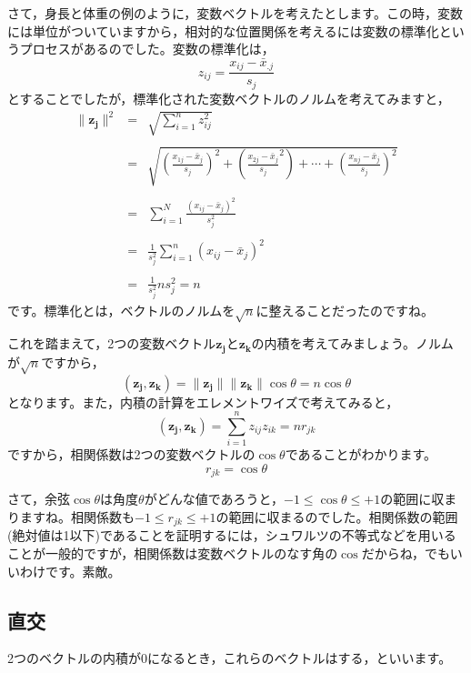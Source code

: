 \documentclass{ltjsbook}
\begin{document}
さて，身長と体重の例のように，変数ベクトルを考えたとします。この時，変数には単位がついていますから，相対的な位置関係を考えるには変数の標準化というプロセスがあるのでした。変数の標準化は，
\[ z_{ij} = \frac{x_{ij} - \bar{x}_{.j}}{s_j} \]
とすることでしたが，標準化された変数ベクトルのノルムを考えてみますと，
\[
	\begin{array}{lll}
		\| \bm{z_j} \|^2 & = & \sqrt{ \sum_{i=1}^n z_{ij}^2 }                                                        \\&&\\
		                 & = & \sqrt{ (\frac{x_{1j}-\bar{x}_j}{s_j})^2 + (\frac{x_{2j}-\bar{x}_j}{s_j}^2) + \cdots +
		(\frac{x_{nj}-\bar{x}_j}{s_j} )^2  }                                                                         \\&&\\
		                 & = & \sum_{i=1}^N\frac{(x_{ij}-\bar{x}_j)^2}{s_j^2}                                        \\&&\\
		                 & = & \frac{1}{s_j^2}\sum_{i=1}^n (x_{ij}-\bar{x}_j)^2                                      \\&&\\
		                 & = & \frac{1}{s_j^2} ns_j^2 =n
	\end{array}
\]
です。標準化とは，ベクトルのノルムを$\sqrt{n}$に整えることだったのですね。

これを踏まえて，2つの変数ベクトル$\bm{z_j}$と$\bm{z_k}$の内積を考えてみましょう。ノルムが$\sqrt{n}$ですから，
\[ (\bm{z_j},\bm{z_k}) = \| \bm{z_j} \| \| \bm{z_k} \| \cos \theta  = n\cos \theta\]
となります。また，内積の計算をエレメントワイズで考えてみると，
\[ (\bm{z_j},\bm{z_k}) = \sum_{i=1}^n z_{ij}z_{ik} = nr_{jk} \]
ですから，相関係数は2つの変数ベクトルの$\cos \theta$であることがわかります。
\[ r_{jk} = \cos \theta \]

さて，余弦$\cos \theta$は角度$\theta$がどんな値であろうと，$-1 \le \cos \theta \le +1$の範囲に収まりますね。相関係数も$-1 \le r_{jk} \le +1$の範囲に収まるのでした。相関係数の範囲(絶対値は1以下)であることを証明するには，シュワルツの不等式などを用いることが一般的ですが，相関係数は変数ベクトルのなす角の$\cos$だからね，でもいいわけです。素敵。

\subsection{直交~\label{OrthgonalAxis}}
2つのベクトルの内積が0になるとき，これらのベクトルはする，といいます。
\end{document}
